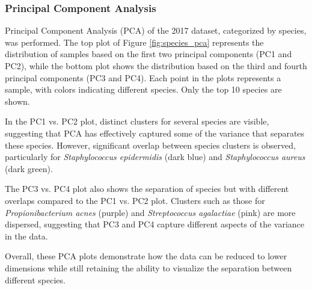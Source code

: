 \documentclass[english,11pt,a4paper,titlepage]{article}
\begin{document}
\subsubsection*{Principal Component Analysis}
Principal Component Analysis (PCA) of the 2017 dataset, categorized by species, was performed. The top plot of Figure \ref{fig:species_pca} represents the distribution of samples based on the first two principal components (PC1 and PC2), while the bottom plot shows the distribution based on the third and fourth principal components (PC3 and PC4). Each point in the plots represents a sample, with colors indicating different species. Only the top 10 species are shown.

In the PC1 vs. PC2 plot, distinct clusters for several species are visible, suggesting that PCA has effectively captured some of the variance that separates these species. However, significant overlap between species clusters is observed, particularly for \textit{Staphylococcus epidermidis} (dark blue) and \textit{Staphylococcus aureus} (dark green).

The PC3 vs. PC4 plot also shows the separation of species but with different overlaps compared to the PC1 vs. PC2 plot. Clusters such as those for \textit{Propionibacterium acnes} (purple) and \textit{Streptococcus agalactiae} (pink) are more dispersed, suggesting that PC3 and PC4 capture different aspects of the variance in the data.

Overall, these PCA plots demonstrate how the data can be reduced to lower dimensions while still retaining the ability to visualize the separation between different species.
\end{document}
